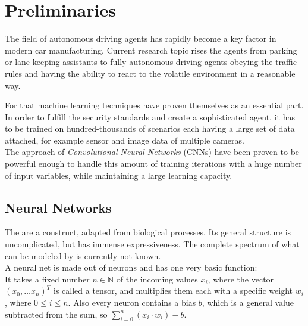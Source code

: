 \chapter{Preliminaries}

The field of autonomous driving agents has rapidly become a key factor in modern car manufacturing. Current research topic rises the agents from parking or lane keeping assistants to fully autonomous driving agents obeying the traffic rules and having the ability to react to the volatile environment in a reasonable way.

For that machine learning techniques have proven themselves as an essential part. In order to fulfill the security standards and create a sophisticated agent, it has to be trained on hundred-thousands of scenarios each having a large set of data attached, for example sensor and image data of multiple cameras.\\
The approach of \textit{Convolutional Neural Networks} (CNNs) have been proven to be powerful enough to handle this amount of training iterations with a huge number of input variables, while maintaining a large learning capacity. \cite{krizhevsky2012imagenet}


\section{Neural Networks}\label{sec: NN}

The \nns are a construct, adapted from biological processes. Its general structure is uncomplicated, but has immense expressiveness. The complete spectrum of what can be modeled by \nns is currently not known.\\
A neural net is made out of neurons and has one very basic function:\\
It takes a fixed number $n \in \mathbb{N}$ of the incoming values $x_i$, where the vector $(x_0,\dots x_n)^T$ is called a tensor, and multiplies them each with a specific weight $w_i$, where $0 \le i \le n$.
Also every neuron contains a bias $b$, which is a general value subtracted from the sum, so $\sum_{i=0}^{n} (x_i \cdot w_i) -b$. 

